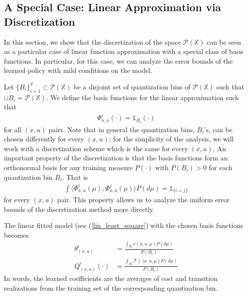 \documentclass[twoside,11pt]{article}
\def\P{{\mathcal P}}
\begin{document}
\subsection{A Special Case: Linear Approximation via Discretization}\label{disc_model}
 In this section, we show that the discretization of the space $\P(\mathds{X})$ can be seen as a particular case of linear function approximation with a special class of basis functions. In particular, for this case, we can analyze the error bounds of the learned policy with mild conditions on the model.

Let $\{B_i\}_{i=1}^d\subset \P(\mathds{X})$ be a disjoint set of quantization bins of $\P(\mathds{X})$ such that $\cup B_i = \P(\mathds{X})$. We define the basis functions for the linear approximation such that  
\begin{align*}
\Phi^i_{x,u}(\cdot) = \mathds{1}_{B_i}(\cdot)
\end{align*}
for all $(x,u)$ pairs. Note that in general the quantization bins, $B_i$'s, can be chosen differently for every $(x,u)$; for the simplicity of the analysis, we will work with a discretization scheme which is the same for every $(x,u)$. An important property of the discretization is that the basis functions form an orthonormal basis for any training measure $P(\cdot)$  with $P(B_i)>0$ for each quantization bin $B_i$. That  is 
\begin{align*}
\int \big\langle \Phi^i_{x,u}(\mu), \Phi^j_{x,u}(\mu)\big\rangle P(d\mu) = \mathds{1}_{\{i=j\}}
\end{align*}
for every $(x,u)$ pair. This property allows us to analyze the uniform error bounds of the discretization method more directly.


The linear fitted model (see (\ref{lin_least_square}) with the chosen basis functions becomes
\begin{align}\label{quant_coef}
\theta^i_{(x,u)} &=   \frac{\int_{B_i}c(x,u,\mu) P(d\mu)  }{P(B_i)}\nonumber\\
Q^i_{(x,u)}(\cdot) &= \frac{\int_{B_i} \mathcal{T}(\cdot|x,u,\mu)P(d\mu) }{P(B_i)} 
\end{align} 
In words, the learned coefficients are the averages of  cost and transition realizations from the training set of the corresponding quantization bin. 
\end{document}
